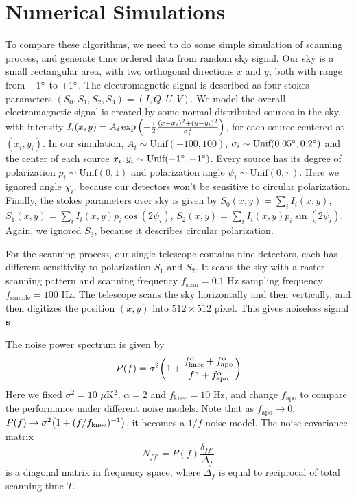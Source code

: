 \documentclass[11pt, letterpaper]{article}
\begin{document}
\section{Numerical Simulations}
To compare these algorithms, we need to do some simple simulation of scanning
process, and generate time ordered data from random sky signal.
Our sky is a small rectangular area, with two orthogonal directions $x$ and
$y$, both with range from $-1\degree$ to $+1\degree$.
The electromagnetic signal is described as four stokes parameters
$(S_0, S_1, S_2, S_3) = (I,Q,U,V)$.
We model the overall electromagnetic signal is created by some normal
distributed sources in the sky, with intensity $I_i (x,y)
= A_i \exp\qty(-\frac{1}{2} \frac{(x-x_{i})^2 + (y-y_{i})^2}{\sigma_i^2})$,
for each source centered at $(x_i,y_i)$.
In our simulation, $A_i \sim \text{Unif} (-100, 100)$,
$\sigma_i \sim \text{Unif}(0.05\degree, 0.2\degree)$ 
and the center of each source
$x_i, y_i \sim \text{Unif}(-1\degree, +1\degree)$.
Every source has its degree of polarization $p_i \sim \text{Unif}(0,1)$ and 
polarization angle $\psi_i \sim \text{Unif}(0,\pi)$.
Here we ignored angle $\chi_i$, because our detectors won't be sensitive to
circular polarization.
Finally, the stokes parameters over sky is given by
$S_0(x,y) = \sum_i I_i(x,y)$, $S_1(x,y) = \sum_i I_i(x,y) p_i \cos(2\psi_i)$,
$S_2(x,y) = \sum_i I_i(x,y) p_i \sin(2\psi_i)$.
Again, we ignored $S_3$, because it describes circular polarization.

For the scanning process, our single telescope contains nine detectors,
each has different sensitivity to polarization $S_1$ and $S_2$.
It scans the sky with a raster scanning pattern and scanning frequency
$f_{\text{scan}} = 0.1$ Hz sampling frequency $f_{\text{sample}} = 100$ Hz.
The telescope scans the sky horizontally and then vertically,
and then digitizes the position $(x, y)$ into $512\times 512$ pixel.
This gives noiseless signal $\vb{s}$.

The noise power spectrum is given by
\begin{align}
P(f) = \sigma^2 \qty(1+ \frac{f_{\text{knee}}^{\alpha}+f_{\text{apo}}^{\alpha}}
    {f^{\alpha}+f_{\text{apo}}^{\alpha}}) \label{noise power spectrum}
\end{align}
Here we fixed $\sigma^2 = 10$ $\mu$K$^2$, $\alpha = 2$ and $f_{\text{knee}} = 10$ Hz,
and change $f_{\text{apo}}$ to compare the performance under different noise
models.
Note that as $f_{\text{apo}} \rightarrow 0 $,
$P(f) \rightarrow \sigma^2\qty(1 + (f/f_{\text{knee}})^{-1} )$, 
it becomes a $1/f$ noise model.
The noise covariance matrix 
\begin{equation}
N_{ff'} = P(f) \frac{\delta_{ff'}}{\Delta_f}
\end{equation}
is a diagonal matrix in frequency space, where $\Delta_f$ is equal to reciprocal
of total scanning time $T$.
\end{document}

